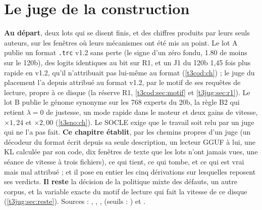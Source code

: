 
\chapter{Le juge de la construction}\label{t3jug:ch}

\begin{origine}
\textbf{Au départ}, deux lots qui se disent finis, et des chiffres produits par leurs seuls auteurs, sur les fenêtres où leurs mécanismes ont été mis au point. Le lot A publie un format \texttt{.trc} v1.2 sans perte (le signe d'un zéro fondu, \SI{1.80}{\Go} de moins sur le 120b), des logits identiques au bit sur R1, et un J1 du 120b 1,45 fois plus rapide en v1.2, qu'il n'attribuait pas lui-même au format (\cref{t3cod:ch}) ; le juge du placement l'a depuis attribué au format v1.2, par le motif de ses requêtes de lecture, propre à ce disque (la réserve R1, \cref{t3cod:sec:motif} et \cref{t3jug:sec:r1}). Le lot B publie le génome synonyme sur les 768 experts du 20b, la règle B2 qui retient $\lambda = 0$ de justesse, un mode rapide dans le moteur et deux gains de vitesse, $\times 1{,}24$ et $\times 2{,}00$ (\cref{t3sno:ch}). Le SOCLE exige que le travail soit relu par un juge qui ne l'a pas fait.
\textbf{Ce chapitre établit}, par les chemins propres d'un juge (un décodeur du format écrit depuis sa seule description, un lecteur GGUF à lui, une KL calculée par son code, dix fenêtres de texte que les lots n'ont jamais vues, une séance de vitesse à trois fichiers), ce qui tient, ce qui tombe, et ce qui est vrai mais mal attribué ; et il pose en entier les cinq dérivations sur lesquelles reposent ses verdicts.
\textbf{Il reste} la décision de la politique mixte des défauts, un autre corpus, et la variable exacte du motif de lecture qui fait la vitesse de ce disque (\cref{t3jug:sec:reste}).
Sources : , , ,  (seuils : ) et .
\end{origine}

